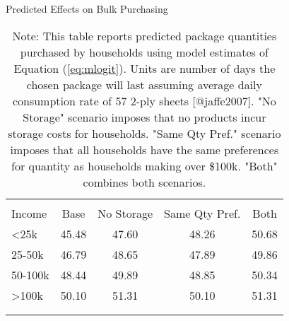 \begin{table}[!htbp] \centering
\caption{Predicted Effects on Bulk Purchasing}
\label{tab:counterfactualMNL}
\begin{tabular}{lcccc}
\\[-1.8ex]\hline
\hline \\[-1.8ex]
Income   & Base   & No Storage  &  Same Qty Pref.  & Both \\
\hline
<25k     & 45.48   & 47.60              & 48.26                  & 50.68 \\
25-50k   & 46.79   & 48.65              & 47.89                  & 49.86 \\
50-100k  & 48.44   & 49.89              & 48.85                  & 50.34 \\
>100k    & 50.10   & 51.31              & 50.10                  & 51.31 \\
\\[-1.8ex]\hline
\hline \\[-1.8ex]
\end{tabular}
\caption*{Note: This table reports predicted package quantities purchased by households using model estimates of Equation (\ref{eq:mlogit}). Units are number of days the chosen package will last assuming average daily consumption rate of 57 2-ply sheets [@jaffe2007]. "No Storage" scenario imposes that no products incur storage costs for households. "Same Qty Pref." scenario imposes that all households have the same preferences for quantity as households making over \$100k. "Both" combines both scenarios.}
\end{table}
